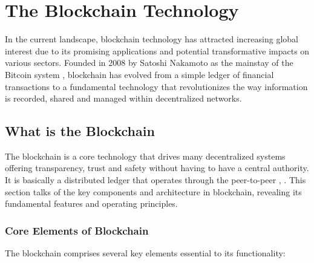 \chapter{The Blockchain Technology} \label{ch:Blockchain}

In the current landscape, blockchain technology has attracted increasing global interest due to its promising applications and potential transformative impacts on various 
sectors. Founded in 2008 by Satoshi Nakamoto as the mainstay of the Bitcoin system \cite{9752154}, blockchain has evolved from a simple ledger of financial transactions 
to a fundamental technology that revolutionizes the way information is recorded, shared and managed within decentralized networks.

\section{What is the Blockchain}

The blockchain is a core technology that drives many decentralized systems offering transparency, trust and safety without having to have a central authority. It is 
basically a distributed ledger that operates through the peer-to-peer \cite{9596538}, \cite{ibm_blockchain}. This section talks of the key components and architecture in 
blockchain, revealing its fundamental features and operating principles.

\subsection{Core Elements of Blockchain}

The blockchain comprises several key elements essential to its functionality:

